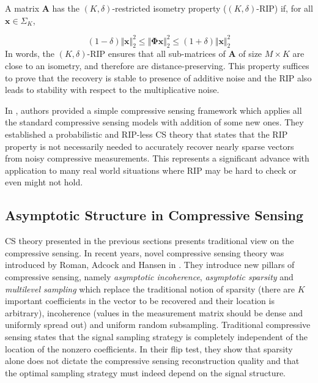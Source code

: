 \documentclass[journal]{IEEEtran}
\begin{document}
A matrix $\boldsymbol{A}$ has the $(K,\delta)$-restricted isometry property ($(K,\delta)$-RIP) if, for all $\boldsymbol{x}\in\Sigma_K$,

\begin{equation} \label{eq:rip}
	(1-\delta)\Vert \boldsymbol{x}\Vert^2_2\leq\Vert\boldsymbol{\Phi }\boldsymbol{x}\Vert_2^2\leq(1+\delta)\Vert\boldsymbol{x}\Vert_2^2
\end{equation}
%
In words, the $(K,\delta)$-RIP ensures that all sub-matrices of $\boldsymbol{A}$ of size $M\times K$ are close to an isometry, and therefore are distance-preserving. This property suffices to prove that the recovery is stable to presence of additive noise and the RIP also leads to stability with respect to the multiplicative noise.

In \cite{Candes2011}, authors provided a simple compressive sensing framework which applies all the standard compressive sensing models with addition of some new ones. They established a probabilistic and RIP-less CS theory that states that the RIP property is not necessarily needed to accurately recover nearly sparse vectors from noisy compressive measurements. This represents a significant advance with application to many real world situations where RIP may be hard to check or even might not hold.

\subsection{Asymptotic Structure in Compressive Sensing}
CS theory presented in the previous sections presents traditional view on the compressive sensing. In recent years, novel compressive sensing theory was introduced by Roman, Adcock and Hansen in \cite{Adcock2013, Adcock2015, Roman2014, Adcock}. They introduce new pillars of compressive sensing, namely \textit{asymptotic incoherence}, \textit{asymptotic sparsity} and \textit{multilevel sampling} which replace the traditional notion of sparsity (there are $K$ important coefficients in the vector to be recovered and their location is arbitrary), incoherence (values in the measurement matrix should be dense and uniformly spread out) and uniform random subsampling. Traditional compressive sensing states that the signal sampling strategy is completely independent of the location of the nonzero coefficients. In their flip test, they show that sparsity alone does not dictate the compressive sensing reconstruction quality and that the optimal sampling strategy must indeed depend on the signal structure.
\end{document}
